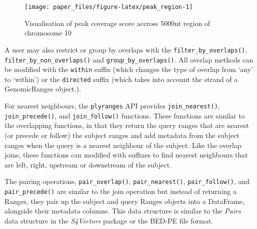 \documentclass[10pt,letterpaper]{article}
\newenvironment{Shaded}{\begin{snugshade}}{\end{snugshade}}
\newcommand{\DataTypeTok}[1]{\textcolor[rgb]{0.13,0.29,0.53}{#1}}
\newcommand{\KeywordTok}[1]{\textcolor[rgb]{0.13,0.29,0.53}{\textbf{#1}}}
\newcommand{\NormalTok}[1]{#1}
\newcommand{\OperatorTok}[1]{\textcolor[rgb]{0.81,0.36,0.00}{\textbf{#1}}}
\newcommand{\StringTok}[1]{\textcolor[rgb]{0.31,0.60,0.02}{#1}}
\begin{document}
\begin{Shaded}
\end{Shaded}

\begin{figure}

{\centering \texttt{[image: paper\_files/figure-latex/peak\_region-1]} 

}

\caption{Visualisation of peak coverage score accross 5000nt region of chromosome 10}\label{fig:peak_region}
\end{figure}

A user may also restrict or group by overlaps with the
\texttt{filter\_by\_overlaps()}, \texttt{filter\_by\_non\_overlaps()}
and \texttt{group\_by\_overlaps()}. All overlap methods can be modified
with the \texttt{within} suffix (which changes the type of overlap from
`any' to `within') or the \texttt{directed} suffix (which takes into
account the strand of a GenomicRanges object.).

For nearest neighbours, the \texttt{plyranges} API provides
\texttt{join\_nearest()}, \texttt{join\_precede()}, and
\texttt{join\_follow()} functions. These functions are similar to the
overlapping functions, in that they return the query ranges that are
nearest (or precede or follow) the subject ranges and add metadata from
the subject ranges when the query is a nearest neighbour of the subject.
Like the overlap joins, these functions can modified with suffixes to
find nearest neighbours that are left, right, upstream or downstream of
the subject.

The pairing operations, \texttt{pair\_overlap()},
\texttt{pair\_nearest()}, \texttt{pair\_follow()}, and
\texttt{pair\_precede()} are similar to the join operation but instead
of returning a Ranges, they pair up the subject and query Ranges objects
into a DataFrame, alongside their metadata columns. This data structure
is similar to the \emph{Pairs} data structure in the \emph{S4Vectors}
package or the BED-PE file format.
\end{document}
